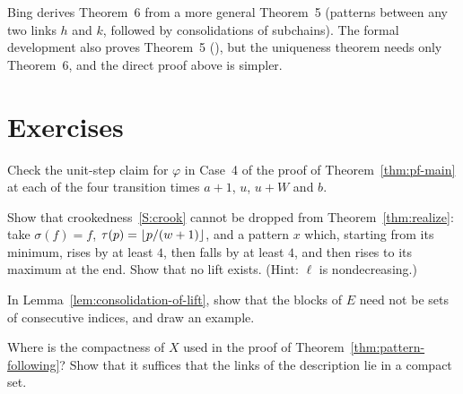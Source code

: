 
\begin{remark}
Bing derives Theorem~6 from a more general Theorem~5 (patterns between any two links $h$ and $k$, followed by
consolidations of subchains). The formal development also proves Theorem~5 (), but
the uniqueness theorem needs only Theorem~6, and the direct proof above is simpler.
\end{remark}

\section*{Exercises}

\begin{exercise}
Check the unit-step claim for $\varphi$ in Case~4 of the proof of Theorem~\ref{thm:pf-main} at each of the four
transition times $a+1$, $u$, $u+W$ and $b$.
\end{exercise}

\begin{exercise}
Show that crookedness~\ref{S:crook} cannot be dropped from Theorem~\ref{thm:realize}: take $\sigma(f)=f$, $\tau(p)=\left\lfloor p/(w+1)\right\rfloor$,
and a pattern $x$ which, starting from its minimum, rises by at least $4$, then falls by at least $4$, and then rises to its
maximum at the end. Show that no lift exists. (Hint: $\ell$ is nondecreasing.)
\end{exercise}

\begin{exercise}
In Lemma~\ref{lem:consolidation-of-lift}, show that the blocks of $E$ need not be sets of consecutive indices, and draw an example.
\end{exercise}

\begin{exercise}
Where is the compactness of $X$ used in the proof of Theorem~\ref{thm:pattern-following}? Show that it suffices that the
links of the description lie in a compact set.
\end{exercise}
